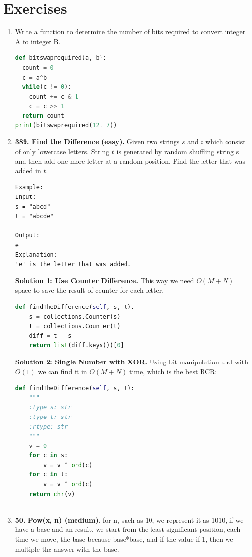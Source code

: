 \documentclass[../main.tex]{subfiles}
\begin{document}
\section{Exercises}
\begin{enumerate}
\item Write a function to determine the number of bits required to convert integer A to integer B.
\begin{lstlisting}[language = Python]
def bitswaprequired(a, b):
  count = 0
  c = a^b
  while(c != 0):
    count += c & 1
    c = c >> 1
  return count
print(bitswaprequired(12, 7))
\end{lstlisting}

\item \textbf{389. Find the Difference (easy).} Given two strings $s$ and $t$ which consist of only lowercase letters. String $t$ is generated by random shuffling string s and then add one more letter at a random position. Find the letter that was added in $t$.
\begin{lstlisting}[numbers=none]
Example:
Input:
s = "abcd"
t = "abcde"

Output:
e
Explanation:
'e' is the letter that was added.
\end{lstlisting}
\textbf{Solution 1: Use Counter Difference.} This way we need $O(M+N)$ space to save the result of counter for each letter. 
\begin{lstlisting}[language=Python]
def findTheDifference(self, s, t):
    s = collections.Counter(s)
    t = collections.Counter(t)
    diff = t - s
    return list(diff.keys())[0]
\end{lstlisting}
\textbf{ Solution 2: Single Number with XOR.}  Using bit manipulation and with $O(1)$ we can find it in $O(M+N)$ time, which is the best BCR:
\begin{lstlisting}[language=Python]
def findTheDifference(self, s, t):
    """
    :type s: str
    :type t: str
    :rtype: str
    """
    v = 0
    for c in s:
        v = v ^ ord(c)
    for c in t:
        v = v ^ ord(c)
    return chr(v)
    
\end{lstlisting}

\item \textbf{50. Pow(x, n) (medium).} for n, such as 10, we represent it as 1010, if we have a base and an result, we start from the least significant position, each time we move, the base because base*base, and if the value if 1, then we multiple the answer with the base. 





\end{enumerate}
\end{document}
